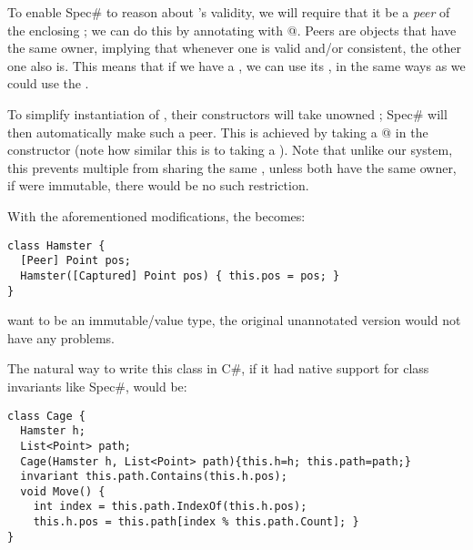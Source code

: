 To enable Spec\# to reason about \Q@pos@'s validity, we will require that it be a \emph{peer} of the enclosing \Q@Hamster@; we can do this by annotating \Q@pos@ with \Q@[Peer]@. Peers are objects that have the same owner, implying that  whenever one is valid and/or consistent, the other one also is. This means that if we have a \Q@Hamster@, we can use its \Q@pos@, in the same ways as we could use the \Q@Hamster@.

To simplify instantiation of \Q@Hamster@s, their constructors will take unowned \Q@Point@s; Spec\# will then automatically make such \Q@Point@ a peer. This is achieved by taking a \Q@[Captured]@ \Q@Point@ in the constructor (note how similar this is to taking a \Q@capsule@ \Q@Point@). Note that unlike our system, this prevents multiple \Q@Hamster@s from sharing the same \Q@Point@, unless both \Q@Hamster@s have the same owner, if \Q@Point@ were immutable, there would be no such restriction.

With the aforementioned modifications, the \Q@Hamster@ becomes:
\begin{lstlisting}
class Hamster {
  [Peer] Point pos;
  Hamster([Captured] Point pos) { this.pos = pos; }
}
\end{lstlisting}

  want \Q@Point@ to be an immutable/value type, the original unannotated version would not have any problems.

The natural way to write this class in C\#, if it had native support for class invariants like Spec\#, would be:
\begin{lstlisting}
class Cage {
  Hamster h;
  List<Point> path;
  Cage(Hamster h, List<Point> path){this.h=h; this.path=path;}
  invariant this.path.Contains(this.h.pos);
  void Move() { 
    int index = this.path.IndexOf(this.h.pos);
    this.h.pos = this.path[index % this.path.Count]; } 
}
\end{lstlisting}

